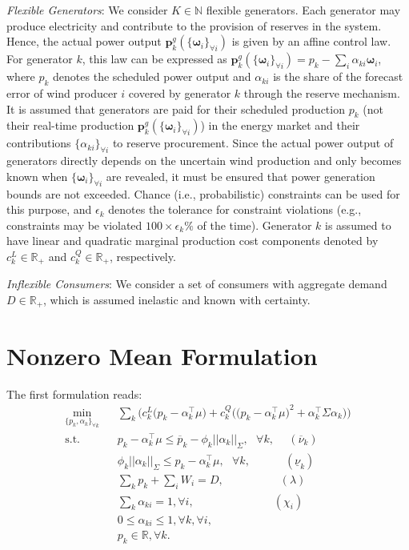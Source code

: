 \documentclass{article}
\begin{document}
\textit{Flexible Generators}: We consider $K \in \mathbb{N}$ flexible generators. Each generator may produce electricity and contribute to the provision of reserves in the system. Hence, the actual power output $\mathbf{p}_k^g(\{\boldsymbol{\omega}_i\}_{\forall i})$ is given by an affine control law. For generator $k$, this law can be expressed as $\mathbf{p}_k^g(\{\boldsymbol{\omega}_i\}_{\forall i}) = p_k - \sum_{i }\alpha_{ki} \boldsymbol{\omega}_i$, where $p_k$ denotes the scheduled power output and $\alpha_{ki}$ is the share of the forecast error of wind producer $i$ covered by generator $k$ through the reserve mechanism. It is assumed that generators are paid for their scheduled production $p_k$ (not their real-time production $\mathbf{p}_k^g(\{\boldsymbol{\omega}_i\}_{\forall i})$) in the energy market and their contributions $\{\alpha_{ki}\}_{\forall i}$ to reserve procurement. Since the actual power output of generators directly depends on the uncertain wind production and only becomes known when $\{\boldsymbol{\omega}_i\}_{\forall i}$ are revealed, it must be ensured that power generation bounds are not exceeded. Chance (i.e., probabilistic) constraints can be used for this purpose, and $\epsilon_k$ denotes the tolerance for constraint violations (e.g., constraints may be violated $100 \times \epsilon_k \%$ of the time). Generator $k$ is assumed to have linear and quadratic marginal production cost components denoted by $c_k^L \in \mathbb{R}_+$ and $c_k^Q \in \mathbb{R}_+$, respectively.

\textit{Inflexible Consumers}: We consider a set of consumers with aggregate demand $D \in \mathbb{R}_+$, which is assumed inelastic and known with certainty. 

\section{Nonzero Mean Formulation}

The first formulation reads:
\begin{align}
\underset{\{p_k, \alpha_k\}_{\forall k}}{\min} \hspace{10pt} & \sum_k \Big(c_k^L\big(p_k - \alpha_k^\top \mu\big) + c_k^Q \Big(\big(p_k - \alpha_{k}^\top \mu \big)^2 + \alpha_k^\top \Sigma \alpha_k\Big)\Big)\\
\mbox{s.t. } & p_k - \alpha_k^\top \mu\le \overline{p}_k - \phi_k ||\alpha_k||_{\Sigma}, \mbox{ }\forall k, \hspace{15pt}(\overline{\nu}_k)\\
& \phi_k ||\alpha_k||_{\Sigma} \le p_k - \alpha_k^\top \mu, \mbox{ }\forall k, \hspace{37pt}(\underline{\nu}_k)\\
& \sum_k p_k + \sum_i W_i = D, \hspace{60pt} (\lambda)\\
& \sum_k \alpha_{ki} = 1, \forall i, \hspace{85pt} (\chi_i)\\
& 0 \le \alpha_{ki} \le 1, \forall k, \forall i,\\
& p_k \in \mathbb{R}, \forall k.
\end{align}
\end{document}
